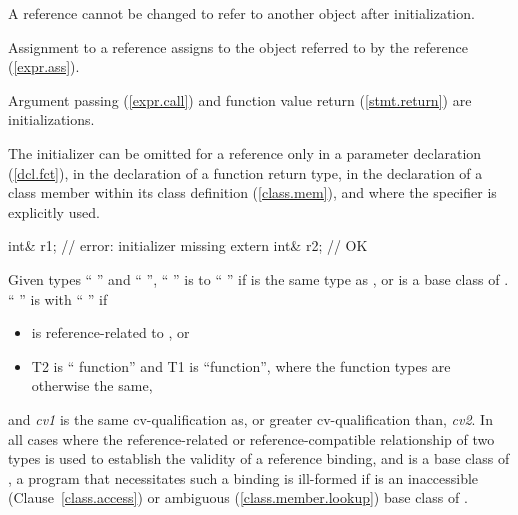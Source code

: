 \pnum
A reference cannot be changed to refer to another object after initialization.
%
\begin{note}
Assignment to a reference assigns to the object referred to by the reference (\ref{expr.ass}).
\end{note}
%
Argument passing (\ref{expr.call})
%
and function value return (\ref{stmt.return}) are initializations.

\pnum
The initializer can be omitted for a reference only in a parameter declaration
(\ref{dcl.fct}), in the declaration of a function return type, in the declaration of
a class member within its class definition (\ref{class.mem}), and where the
specifier is explicitly used.
%
\begin{example}

\begin{codeblock}
int& r1;                        // error: initializer missing
extern int& r2;                 // OK
\end{codeblock}
\end{example}

\pnum
Given types `` '' and `` '',
`` '' is  to
%
`` '' if
 is the same type as , or
 is a base class of .
`` '' is 
%
with `` '' if
\begin{itemize}
\item {} is reference-related to , or
\item T2 is `` function'' and T1 is ``function'',
where the function types are otherwise the same,
\end{itemize}
and
\textit{cv1}
is the same cv-qualification as, or greater cv-qualification than,
\textit{cv2}.
In all cases where the reference-related or reference-compatible relationship
of two types is used to establish the validity of a reference binding, and
is a base class of
,
a program that necessitates such a binding is ill-formed if
is an inaccessible (Clause~\ref{class.access}) or ambiguous (\ref{class.member.lookup})
base class of
.

